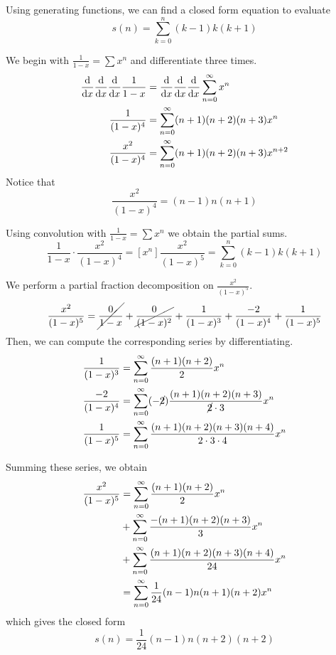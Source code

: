 \documentclass[11pt]{article}
\begin{document}

Using generating functions, we can find a closed form equation to evaluate
%
\begin{equation*}
    s(n) = \sum_{k=0}^n (k-1)k(k+1)
\end{equation*}

We begin with $\frac{1}{1-x} = \sum x^n$ and differentiate three times.
%
\begin{align*}
    \frac{\mathrm{d} }{\mathrm{d} x} \frac{\mathrm{d} }{\mathrm{d} x} \frac{\mathrm{d} }{\mathrm{d} x} \frac{1}{1-x}
    &= \frac{\mathrm{d} }{\mathrm{d} x} \frac{\mathrm{d} }{\mathrm{d} x} \frac{\mathrm{d} }{\mathrm{d} x} \sum^\infty_{n=0} x^n \\
    \frac{1}{(1-x)^4} &= \sum^\infty_{n=0} (n+1)(n+2)(n+3) x^n \\
    \frac{x^2}{(1-x)^4} &= \sum^\infty_{n=0} (n+1)(n+2)(n+3) x^{n+2}
\end{align*}
%
Notice that
%
\begin{equation*}
    [x^n] \frac{x^2}{(1-x)^4} = (n-1)n(n+1)
\end{equation*}

Using convolution with $\frac{1}{1-x} = \sum x^n$ we obtain the partial sums.
%
\begin{equation*}
    [x^n] \frac{1}{1-x} \cdot \frac{x^2}{(1-x)^4}
    = [x^n] \frac{x^2}{(1-x)^5}
    = \sum_{k=0}^n (k-1)k(k+1)
\end{equation*}

We perform a partial fraction decomposition on $\frac{x^2}{(1-x)^5}$.
%
\begin{equation*}
    \frac{x^2}{(1-x)^5}
    = \cancel{\frac{0}{1-x}}
    + \cancel{\frac{0}{(1-x)^2}}
    + \frac{1}{(1-x)^3}
    + \frac{-2}{(1-x)^4}
    + \frac{1}{(1-x)^5}
\end{equation*}
%
Then, we can compute the corresponding series by differentiating.
%
\begin{align*}
    \frac{1}{(1-x)^3}
    &= \sum^\infty_{n=0} \frac{(n+1)(n+2)}{2} x^n \\
    \frac{-2}{(1-x)^4}
    &= \sum^\infty_{n=0}
        (-\cancel{2}) \frac{(n+1)(n+2)(n+3)}{\cancel{2} \cdot 3}
        x^n \\
    \frac{1}{(1-x)^5}
    &= \sum^\infty_{n=0} \frac{(n+1)(n+2)(n+3)(n+4)}{2 \cdot 3 \cdot 4} x^n
\end{align*}

Summing these series, we obtain
%
\begin{align*}
    \frac{x^2}{(1-x)^5}
    &= \sum^\infty_{n=0} \frac{(n+1)(n+2)}{2} x^n \\
    &+ \sum^\infty_{n=0} \frac{-(n+1)(n+2)(n+3)}{3} x^n \\
    &+ \sum^\infty_{n=0} \frac{(n+1)(n+2)(n+3)(n+4)}{24} x^n \\
    &= \sum^\infty_{n=0} \frac{1}{24} (n-1)n(n+1)(n+2) x^n
\end{align*}
%
which gives the closed form
%
\begin{equation*}
    s(n) = \frac{1}{24} (n-1)n(n+2)(n+2)
\end{equation*}
\end{document}
